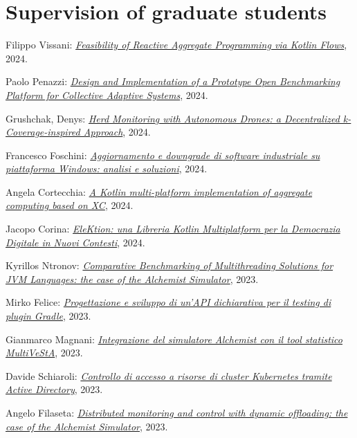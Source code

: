 \section{Supervision of graduate students}
\vspace{-1em}
\begin{innerlist}
    \item Filippo Vissani: \href{https://amslaurea.unibo.it/31108/}{\textit{Feasibility of Reactive Aggregate Programming via Kotlin Flows}}, 2024.
    \item Paolo Penazzi: \href{https://amslaurea.unibo.it/31110/}{\textit{Design and Implementation of a Prototype Open Benchmarking Platform for Collective Adaptive Systems}}, 2024.
    \item Grushchak, Denys: \href{https://amslaurea.unibo.it/31105/}{\textit{Herd Monitoring with Autonomous Drones: a Decentralized k-Coverage-inspired Approach}}, 2024.
    \item Francesco Foschini: \href{https://amslaurea.unibo.it/31121/}{\textit{Aggiornamento e downgrade di software industriale su piattaforma Windows: analisi e soluzioni}}, 2024.
    \item Angela Cortecchia: \href{https://amslaurea.unibo.it/31080/}{\textit{A Kotlin multi-platform implementation of aggregate computing based on XC}}, 2024.
    \item Jacopo Corina: \href{https://amslaurea.unibo.it/31132/}{\textit{EleKtion: una Libreria Kotlin Multiplatform per la Democrazia Digitale in Nuovi Contesti}}, 2024.
    \item Kyrillos Ntronov: \href{https://amslaurea.unibo.it/29647/}{\textit{Comparative Benchmarking of Multithreading Solutions for JVM Languages: the case of the Alchemist Simulator}}, 2023.
    \item Mirko Felice: \href{https://amslaurea.unibo.it/29136/}{\textit{Progettazione e sviluppo di un'API dichiarativa per il testing di plugin Gradle}}, 2023.
    \item Gianmarco Magnani: \href{https://amslaurea.unibo.it/28184/}{\textit{Integrazione del simulatore Alchemist con il tool statistico MultiVeStA}}, 2023.
    \item Davide Schiaroli: \href{https://amslaurea.unibo.it/28132/}{\textit{Controllo di accesso a risorse di cluster Kubernetes tramite Active Directory}}, 2023.
    \item Angelo Filaseta: \href{https://amslaurea.unibo.it/28111/}{\textit{Distributed monitoring and control with dynamic offloading: the case of the Alchemist Simulator}}, 2023.

\end{innerlist}
